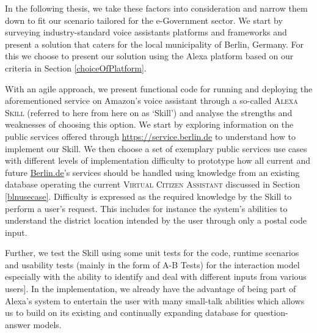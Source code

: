 In the following thesis, we take these factors into consideration and narrow them down to fit our scenario tailored for the e-Government sector. We start by surveying industry-standard %
voice assistants platforms 
and frameworks
and present a solution that caters for the local municipality of Berlin, Germany. For this we choose to present our solution using the Alexa platform based on our criteria in Section \ref{choiceOfPlatform}.

With an agile approach, we present functional code for running and deploying the aforementioned service on Amazon's voice assistant through a so-called \textsc{Alexa Skill} (referred to here from here on as `Skill') and analyse the strengths and weaknesses of choosing this option. We start by exploring information on the public services offered through \href{https://service.berlin.de}{https://service.berlin.de} 
to understand how to implement our Skill. 
We then choose a set of exemplary public services use cases with different levels of implementation difficulty to prototype how all current and future \href{https://service.berlin.de}{Berlin.de}'s 
services should be handled using knowledge from an existing database operating the current \textsc{Virtual Citizen Assistant} discussed in Section \ref{blnusecase}.
Difficulty is expressed as the required knowledge by the Skill to perform a user's request. This includes for instance the system's abilities to understand the district location intended by the user through only a postal code input.

Further, we test the Skill using some unit tests %
for the code, runtime scenarios and usability tests (mainly in the form of A-B Tests) for the interaction model especially with the ability to identify and deal with different inputs from various users].
In the implementation, we already have the advantage of being part of Alexa's system to entertain the user with
many small-talk abilities 
which allows us to build on its existing and continually expanding database for question-answer models.


